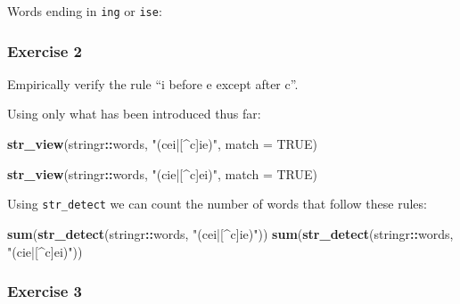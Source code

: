 \documentclass[]{book}
\newenvironment{Shaded}{\begin{snugshade}}{\end{snugshade}}
\newcommand{\DataTypeTok}[1]{\textcolor[rgb]{0.13,0.29,0.53}{#1}}
\newcommand{\KeywordTok}[1]{\textcolor[rgb]{0.13,0.29,0.53}{\textbf{#1}}}
\newcommand{\NormalTok}[1]{#1}
\newcommand{\OperatorTok}[1]{\textcolor[rgb]{0.81,0.36,0.00}{\textbf{#1}}}
\newcommand{\OtherTok}[1]{\textcolor[rgb]{0.56,0.35,0.01}{#1}}
\newcommand{\StringTok}[1]{\textcolor[rgb]{0.31,0.60,0.02}{#1}}
\theoremstyle{definition}
\theoremstyle{definition}
\theoremstyle{definition}
\theoremstyle{remark}
\begin{document}
Words ending in \texttt{ing} or \texttt{ise}:

\begin{Shaded}
\end{Shaded}

\hypertarget{exercise-2-27}{%
\subsubsection{Exercise 2}\label{exercise-2-27}}

Empirically verify the rule ``i before e except after c''.

Using only what has been introduced thus far:

\begin{Shaded}
\begin{Highlighting}[]
\KeywordTok{str_view}\NormalTok{(stringr}\OperatorTok{::}\NormalTok{words, }\StringTok{"(cei|[^c]ie)"}\NormalTok{, }\DataTypeTok{match =} \OtherTok{TRUE}\NormalTok{)}
\end{Highlighting}
\end{Shaded}

\begin{Shaded}
\begin{Highlighting}[]
\KeywordTok{str_view}\NormalTok{(stringr}\OperatorTok{::}\NormalTok{words, }\StringTok{"(cie|[^c]ei)"}\NormalTok{, }\DataTypeTok{match =} \OtherTok{TRUE}\NormalTok{)}
\end{Highlighting}
\end{Shaded}

Using \texttt{str\_detect} we can count the number of words that follow
these rules:

\begin{Shaded}
\begin{Highlighting}[]
\KeywordTok{sum}\NormalTok{(}\KeywordTok{str_detect}\NormalTok{(stringr}\OperatorTok{::}\NormalTok{words, }\StringTok{"(cei|[^c]ie)"}\NormalTok{))}
\KeywordTok{sum}\NormalTok{(}\KeywordTok{str_detect}\NormalTok{(stringr}\OperatorTok{::}\NormalTok{words, }\StringTok{"(cie|[^c]ei)"}\NormalTok{))}
\end{Highlighting}
\end{Shaded}

\hypertarget{exercise-3-23}{%
\subsubsection{Exercise 3}\label{exercise-3-23}}
\end{document}

